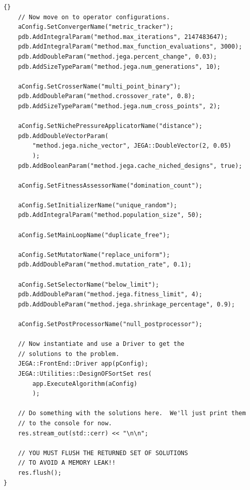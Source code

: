 \begin{lstlisting}[firstnumber=1,stepnumber=5,frame=single]{}
    // Now move on to operator configurations.
    aConfig.SetConvergerName("metric_tracker");
    pdb.AddIntegralParam("method.max_iterations", 2147483647);
    pdb.AddIntegralParam("method.max_function_evaluations", 3000);
    pdb.AddDoubleParam("method.jega.percent_change", 0.03);
    pdb.AddSizeTypeParam("method.jega.num_generations", 10);

    aConfig.SetCrosserName("multi_point_binary");
    pdb.AddDoubleParam("method.crossover_rate", 0.8);
    pdb.AddSizeTypeParam("method.jega.num_cross_points", 2);

    aConfig.SetNichePressureApplicatorName("distance");
    pdb.AddDoubleVectorParam(
        "method.jega.niche_vector", JEGA::DoubleVector(2, 0.05)
        );
    pdb.AddBooleanParam("method.jega.cache_niched_designs", true);

    aConfig.SetFitnessAssessorName("domination_count");

    aConfig.SetInitializerName("unique_random");
    pdb.AddIntegralParam("method.population_size", 50);

    aConfig.SetMainLoopName("duplicate_free");

    aConfig.SetMutatorName("replace_uniform");
    pdb.AddDoubleParam("method.mutation_rate", 0.1);

    aConfig.SetSelectorName("below_limit");
    pdb.AddDoubleParam("method.jega.fitness_limit", 4);
    pdb.AddDoubleParam("method.jega.shrinkage_percentage", 0.9);

    aConfig.SetPostProcessorName("null_postprocessor");

    // Now instantiate and use a Driver to get the
    // solutions to the problem.
    JEGA::FrontEnd::Driver app(pConfig);
    JEGA::Utilities::DesignOFSortSet res(
        app.ExecuteAlgorithm(aConfig)
        );

    // Do something with the solutions here.  We'll just print them
    // to the console for now.
    res.stream_out(std::cerr) << "\n\n";

    // YOU MUST FLUSH THE RETURNED SET OF SOLUTIONS
    // TO AVOID A MEMORY LEAK!!
    res.flush();
}
\end{lstlisting}
